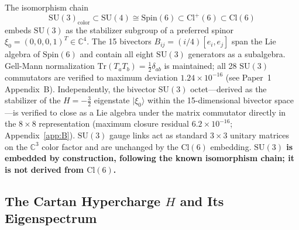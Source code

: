 \documentclass[12pt]{article}
\theoremstyle{definition}
\theoremstyle{remark}
\newcommand{\cl}{\mathrm{Cl}}           %
\newcommand{\spin}{\mathrm{Spin}}       %
\newcommand{\su}{\mathrm{SU}}           %
\newcommand{\tr}{\mathrm{Tr}}           %
\newcommand{\half}{\tfrac{1}{2}}
\begin{document}
	The isomorphism chain
	\begin{equation}
		\su(3)_{\mathrm{color}} \subset \su(4) \cong \spin(6)
		\subset \cl^+(6) \subset \cl(6)
		\label{eq:embedding-chain}
	\end{equation}
	embeds $\su(3)$ as the stabilizer subgroup of a preferred spinor
	$\xi_0=(0,0,0,1)^T\in\mathbb{C}^4$.  The 15 bivectors
	$B_{ij}=(i/4)[e_i,e_j]$ span the Lie algebra of $\spin(6)$ and contain all
	eight $\su(3)$ generators as a subalgebra.  Gell-Mann normalization
	$\tr(T_a T_b)=\half\delta_{ab}$ is maintained; all 28 $\su(3)$ commutators
	are verified to maximum deviation $1.24\times10^{-16}$ (see
	Paper~1~\cite{FirestoneP1} Appendix~B).  Independently, the bivector
	$\su(3)$ octet---derived as the stabilizer of the $H=-\tfrac{3}{2}$
	eigenstate $|\xi_0\rangle$ within the 15-dimensional bivector
	space---is verified to close as a Lie algebra under the matrix
	commutator directly in the $8\times8$ representation (maximum
	closure residual $6.2\times10^{-16}$; Appendix~\ref{app:B}).
	$\su(3)$ gauge links act as
	standard $3\times3$ unitary matrices on the $\mathbb{C}^3$ color factor and
	are unchanged by the $\cl(6)$ embedding.  \textbf{$\su(3)$ is embedded by
		construction, following the known isomorphism chain; it is not derived from
		$\cl(6)$.}
	
	\subsection{The Cartan Hypercharge \texorpdfstring{$H$}{H}
		and Its Eigenspectrum}
	\label{sec:cartan}
	
\end{document}
